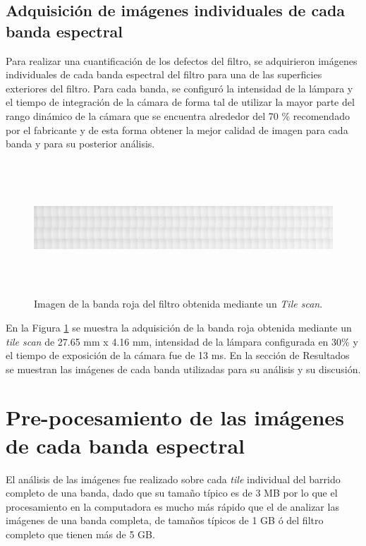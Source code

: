 \documentclass{ctuthesis}
\begin{document}
\singlespacing
\subsection*{Adquisición de imágenes individuales de cada banda espectral}

\hspace{0.5cm}Para realizar una cuantificación de los defectos del filtro, se adquirieron imágenes individuales de cada banda espectral del filtro para una de las superficies exteriores del filtro. Para cada banda, se configuró la intensidad de la lámpara y el tiempo de integración de la cámara de forma tal de utilizar la mayor parte del rango dinámico de la cámara que se encuentra alrededor del 70 \% recomendado por el fabricante y de esta forma obtener la mejor calidad de imagen para cada banda y para su posterior análisis. 

\begin{figure}[!h]
	\centering
	\includegraphics[width=1.0\textwidth,height= 5.0cm]{Figs/defectosZEISS/tilebandaroja.png}
	\caption{Imagen de la banda roja del filtro obtenida mediante un \textit{Tile scan}.}
	\label{fig:tilebandaroja}
\end{figure}

En la Figura \ref{fig:tilebandaroja} se muestra la adquisición de la banda roja obtenida mediante un \textit{tile scan} de 27.65 mm x 4.16 mm, intensidad de la lámpara configurada en 30\% y el tiempo de exposición de la cámara fue de 13 ms. En la sección de Resultados se muestran las imágenes de cada banda utilizadas para su análisis y su discusión.



\singlespacing
\section*{Pre-pocesamiento de las imágenes de cada banda espectral }

\hspace{0.5cm}El análisis de las imágenes fue realizado sobre cada \textit{tile} individual del barrido completo de una banda, dado que su tamaño típico es de 3 MB por lo que el procesamiento en la computadora es mucho más rápido que el de analizar las imágenes de una banda completa, de tamaños típicos de 1 GB ó del filtro completo que tienen más de 5 GB.
\end{document}
